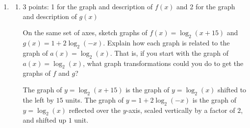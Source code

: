 \documentclass{article}
\begin{document}
\begin{enumerate}
\begin{enumerate}
    \begin{problem}[\vfill\newpage]
      $(\ln x)^2 = 2 \ln x + 8$
    \end{problem}

    \begin{solution}
      We can substitute $u=\ln x$.
      \begin{align*}
        (\ln x)^2 &= 2\ln x + 8 \\
        u^2 &= 2u + 8 \\
        u^2 - 2u - 8 &= 0 \\
        (u-4)(u+2) &= 0
      \end{align*}
      So $u=\ln x$ is either $4$ or $-2$. This gives us the
      solutions $x=\boxed{e^{4}}$ and $x=\boxed{e^{-2}}$.
    \end{solution}

  \end{enumerate}

\item  

  \begin{enumerate}
  \item

    \begin{grading}
      3 points: 1 for the graph and description of $f(x)$ and 2 for the graph and description of $g(x)$
    \end{grading}

    \begin{problem}[\vfill]
      On the same set of axes, sketch graphs of $f(x) = \log_2(x + 15)$ and $g(x) = 1 + 2 \log_2(-x)$. Explain how each graph is related to the graph of $a(x) = \log_2(x)$. That is, if you start with the graph of $a(x) = \log_2(x)$, what graph transformations could you do to get the graphs of $f$ and $g$? 
    \end{problem}

    \begin{solution}
      The graph of $y=\log_2(x+15)$ is the graph of $y=\log_2(x)$
      shifted to the left by $15$ units. The graph of $y=1+2\log_2(-x)$
      is the graph of $y=\log_2(x)$ reflected over the $y$-axis,
      scaled vertically by a factor of $2$, and shifted up $1$ unit.

      \begin{center}
      \end{center}
    \end{solution}


\end{enumerate}
\end{enumerate}
\end{document}
